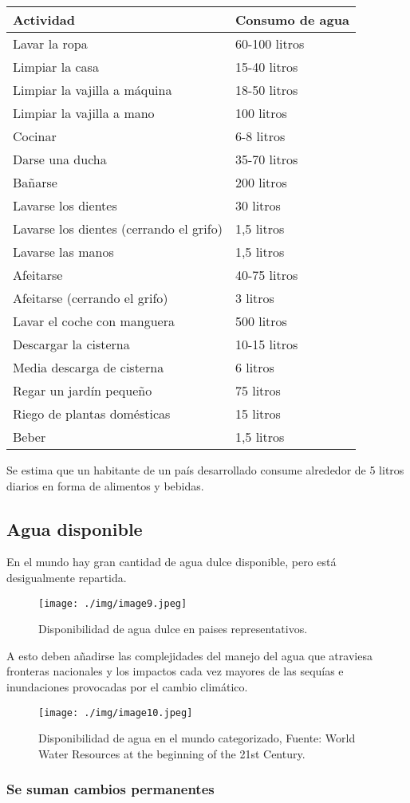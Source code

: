 \documentclass[
  a4paper,12pt]{extarticle}
\begin{document}
\begin{longtable}[]{@{}ll@{}}
\toprule
Actividad & Consumo de agua\tabularnewline
\midrule
\endhead
Lavar la ropa & 60-100 litros\tabularnewline
Limpiar la casa & 15-40 litros\tabularnewline
Limpiar la vajilla a máquina & 18-50 litros\tabularnewline
Limpiar la vajilla a mano & 100 litros\tabularnewline
Cocinar & 6-8 litros\tabularnewline
Darse una ducha & 35-70 litros\tabularnewline
Bañarse & 200 litros\tabularnewline
Lavarse los dientes & 30 litros\tabularnewline
Lavarse los dientes (cerrando el grifo) & 1,5 litros\tabularnewline
Lavarse las manos & 1,5 litros\tabularnewline
Afeitarse & 40-75 litros\tabularnewline
Afeitarse (cerrando el grifo) & 3 litros\tabularnewline
Lavar el coche con manguera & 500 litros\tabularnewline
Descargar la cisterna & 10-15 litros\tabularnewline
Media descarga de cisterna & 6 litros\tabularnewline
Regar un jardín pequeño & 75 litros\tabularnewline
Riego de plantas domésticas & 15 litros\tabularnewline
Beber & 1,5 litros\tabularnewline
\bottomrule
\end{longtable}

Se estima que un habitante de un país desarrollado consume alrededor de
5 litros diarios en forma de alimentos y bebidas.

\hypertarget{agua-disponible}{%
\subsection{Agua disponible}\label{agua-disponible}}

En el mundo hay gran cantidad de agua dulce disponible, pero está
desigualmente repartida.

\begin{figure}
\centering
\texttt{[image: ./img/image9.jpeg]}
\caption{Disponibilidad de agua dulce en paises representativos.}
\end{figure}

A esto deben añadirse las complejidades del manejo del agua que
atraviesa fronteras nacionales y los impactos cada vez mayores de las
sequías e inundaciones provocadas por el cambio climático.

\begin{figure}
\centering
\texttt{[image: ./img/image10.jpeg]}
\caption{Disponibilidad de agua en el mundo categorizado, Fuente: World
Water Resources at the beginning of the 21st Century.}
\end{figure}

\hypertarget{se-suman-cambios-permanentes}{%
\subsubsection{Se suman cambios
permanentes}\label{se-suman-cambios-permanentes}}
\end{document}
